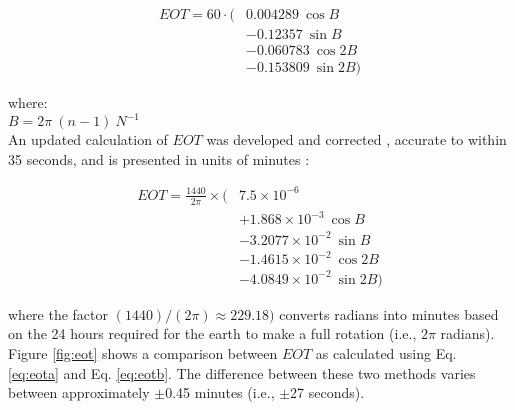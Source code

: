 \begin{equation}
\label{eq:eota}
	\begin{split}
    	EOT = 60 \cdot ( & 0.004289 \: \cos B \\
                              & - 0.12357 \: \sin B \\
                              & - 0.060783 \: \cos 2B \\ 
                              & - 0.153809 \: \sin 2B)
	\end{split}
\end{equation}

\noindent where: \\
\indent $B = 2\pi\: (n-1)\: N^{-1}$ \\

An updated calculation of $EOT$ was developed \parencite{spencer71} and corrected \parencite{oglesby98}, accurate to within 35 seconds, and is presented in units of minutes \parencite{iqbal83}:

\begin{equation}
\label{eq:eotb}
	\begin{split}
    	EOT = \frac{1440}{2\pi} \times ( & 7.5 \times 10^{-6} \\ 
        	& + 1.868 \times 10^{-3} \: \cos B \\ 
            & - 3.2077 \times 10^{-2} \: \sin B \\
            & - 1.4615 \times 10^{-2} \: \cos 2B \\
            & - 4.0849 \times 10^{-2} \: \sin 2B)
	\end{split}
\end{equation}

\noindent where the factor $(1440)/(2\pi) \approx 229.18)$ converts radians into minutes based on the 24 hours required for the earth to make a full rotation (i.e., $2\pi$ radians). 
Figure \ref{fig:eot} shows a comparison between $EOT$ as calculated using Eq. \ref{eq:eota} and Eq. \ref{eq:eotb}. 
The difference between these two methods varies between approximately $\pm$0.45 minutes (i.e., $\pm$27 seconds).\\

